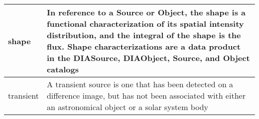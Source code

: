 \begin{longtable}{|p{}|p{}|}
shape & In reference to a \gls{Source} or Object, the \gls{shape} is a functional characterization of its spatial intensity distribution, and the integral of the \gls{shape} is the \gls{flux}. Shape characterizations are a data product in the \gls{DIASource}, \gls{DIAObject}, \gls{Source}, and Object catalogs \\\hline
transient & A \gls{transient} source is one that has been detected on a difference image, but has not been associated with either an \gls{astronomical object} or a solar system body \\\hline
\end{longtable}
